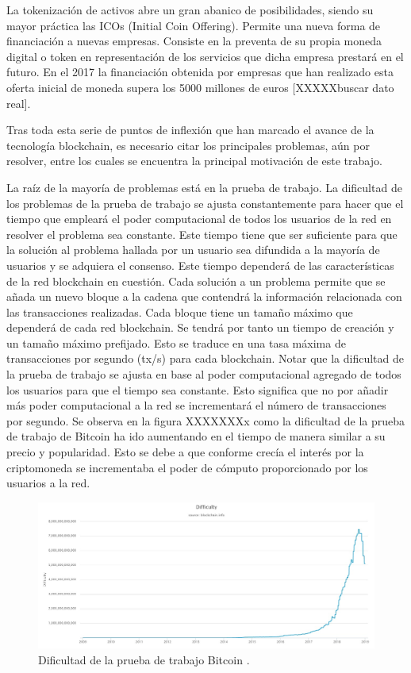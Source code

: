 La tokenización de activos abre un gran abanico de posibilidades, siendo su mayor práctica las ICOs (Initial Coin Offering). Permite una nueva forma de financiación a nuevas empresas. Consiste en la preventa de su propia moneda digital o token en representación de los servicios que dicha empresa prestará en el futuro. En el 2017 la financiación obtenida por empresas que han realizado esta oferta inicial de moneda supera los 5000 millones de euros [XXXXXbuscar dato real]. \newline

Tras toda esta serie de puntos de inflexión que han marcado el avance de la tecnología blockchain, es necesario citar los principales problemas, aún por resolver, entre los cuales se encuentra la principal motivación de este trabajo. \newline

La raíz de la mayoría de problemas está en la prueba de trabajo. La dificultad de los problemas de la prueba de trabajo se ajusta constantemente para hacer que el tiempo que empleará el poder computacional de todos los usuarios de la red en resolver el problema sea constante. Este tiempo tiene que ser suficiente para que la solución al problema hallada por un usuario sea difundida a la mayoría de usuarios y se adquiera el consenso. Este tiempo dependerá de las características de la red blockchain en cuestión. Cada solución a un problema permite que se añada un nuevo bloque a la cadena que contendrá la información relacionada con las transacciones realizadas. Cada bloque tiene un tamaño máximo que dependerá de cada red blockchain. Se tendrá por tanto un tiempo de creación y un tamaño máximo prefijado. Esto se traduce en una tasa máxima de transacciones por segundo (tx/s) para cada blockchain. Notar que la dificultad de la prueba de trabajo se ajusta en base al poder computacional agregado de todos los usuarios para que el tiempo sea constante. Esto significa que no por añadir más poder computacional a la red se incrementará el número de transacciones por segundo. Se observa en la figura XXXXXXXx como la dificultad de la prueba de trabajo de Bitcoin ha ido aumentando en el tiempo de manera similar a su precio y popularidad. Esto se debe a que conforme crecía el interés por la criptomoneda se incrementaba el poder de cómputo proporcionado por los usuarios a la red.\newline

\begin{figure}
	\centering
	\includegraphics[width=1\textwidth]{imagenes/difficulty.jpeg}
	\caption{\label{fig1}Dificultad de la prueba de trabajo Bitcoin \cite{blockchaininfo}.}
\end{figure}

